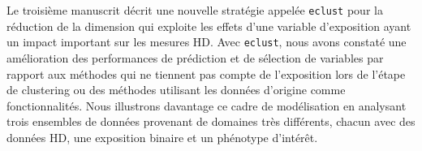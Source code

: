\documentclass[12pt,letterpaper]{report}
\begin{document}
\begin{romanPagenumber}{2}
{Le troisième manuscrit décrit une nouvelle stratégie appelée \texttt{eclust} pour la réduction de la dimension qui exploite les effets d'une variable d'exposition ayant un impact important sur les mesures HD. Avec \texttt{eclust}, nous avons constaté une amélioration des performances de prédiction et de sélection de variables par rapport aux méthodes qui ne tiennent pas compte de l'exposition lors de l'étape de clustering ou des méthodes utilisant les données d'origine comme fonctionnalités. Nous illustrons davantage ce cadre de modélisation en analysant trois ensembles de données provenant de domaines très différents, chacun avec des données HD, une exposition binaire et un phénotype d'intérêt.
	}
	\AbstractFr
	
	
	\tableofcontents 

	\listoftables 
	\listoffigures
	
	\end{romanPagenumber}

\else
\fi


\doublespacing

\ifthesis
	
	
	
	
	
	
	
\else
	
	
	
	
	
	
	
\fi


\ifthesis
\else
\fi
	

%
\end{document}
